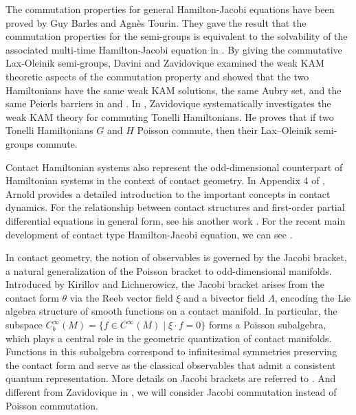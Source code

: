\documentclass[preprint]{elsarticle}
\numberwithin{equation}{section}
\begin{document}
The commutation properties for general Hamilton-Jacobi equations have been proved by Guy Barles and Agnès Tourin. They gave the result that the commutation properties for the semi-groups is equivalent to the solvability of the associated multi-time Hamilton-Jacobi equation in \cite{GA}.  By giving the commutative Lax-Oleinik semi-groups, Davini and Zavidovique examined the weak KAM theoretic aspects of the commutation property and showed that the two Hamiltonians have the same weak KAM solutions, the same Aubry set, and the same Peierls barriers in \cite{davini2013weak} and \cite{zavidovique2010weak}. In \cite{zavidovique2010weak}, Zavidovique systematically investigates the weak KAM theory for commuting Tonelli Hamiltonians. He proves that if two Tonelli Hamiltonians $G$ and $H$ Poisson commute, then their Lax–Oleinik semi-groups commute.

Contact Hamiltonian systems also represent the odd-dimensional counterpart of Hamiltonian systems in the context of contact geometry. In Appendix 4 of \cite{arnold1989mathematical}, Arnold provides a detailed introduction to the important concepts in contact dynamics. For the relationship between contact structures and first-order partial differential equations in general form, see his another work \cite{arnold2004lectures}. For the recent main development of contact type Hamilton-Jacobi equation, we can see \cite{cannarsa2020herglotz} \cite{wang2019aubry} \cite{wang2021weak} \cite{ishii2022hamilton} \cite{wang2023time} \cite{wang2025time} \cite{ni2024nonlinear} \cite{ni2025representation}.

In contact geometry, the notion of observables is governed by the Jacobi bracket, a natural generalization of the Poisson bracket to odd-dimensional manifolds. Introduced by Kirillov and Lichnerowicz, the Jacobi bracket arises from the contact form \(\theta\) via the Reeb vector field \(\xi\) and a bivector field \(\Lambda\), encoding the Lie algebra structure of smooth functions on a contact manifold. In particular, the subspace \(C_b^\infty(M) = \{f \in C^\infty(M) \mid \xi \cdot f = 0\}\) forms a Poisson subalgebra, which plays a central role in the geometric quantization of contact manifolds. Functions in this subalgebra correspond to infinitesimal symmetries preserving the contact form and serve as the classical observables that admit a consistent quantum representation. More details on Jacobi brackets are referred to \cite{SF}. And different from Zavidovique in \cite{zavidovique2010weak}, we will consider Jacobi commutation instead of Poisson commutation.
\end{document}
